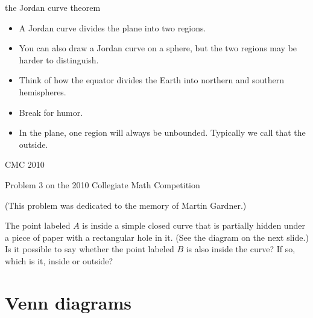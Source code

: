 \documentclass[handout,landscape]{beamer}
\begin{document}
\begin{frame}{the Jordan curve theorem}
\begin{itemize}
\item A Jordan curve divides the plane into two regions.\pause
\item You can also draw a Jordan curve on a sphere, but the two regions may be harder to distinguish. \pause
\item Think of how the equator divides the Earth into northern and southern hemispheres. \pause
\item Break for humor. \pause
\item In the plane, one region will always be unbounded.  Typically we call that the outside.
\end{itemize}
\end{frame}

\begin{frame}{CMC 2010}
\centerline{Problem 3 on the 2010 Collegiate Math Competition}

 (This problem was dedicated to the memory of Martin Gardner.)  

The point labeled $A$ is inside a simple closed curve that is partially hidden under a piece of paper with a rectangular hole in it. (See the diagram on the next slide.)  Is it possible to say whether the point labeled $B$ is also inside the curve?  If so, which is it, inside or outside?

\end{frame}

{ %
\begin{frame}[plain]
\rule{0pt}{0pt}
\end{frame} 
} %

{ %
\begin{frame}[plain]
\rule{0pt}{0pt}
\end{frame} 
} %


\section{Venn diagrams}
\end{document}
